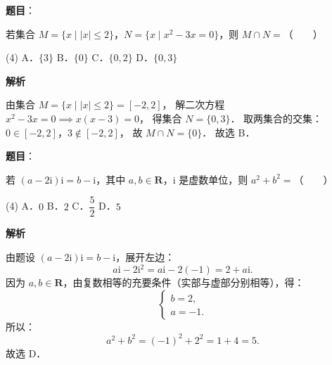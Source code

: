 
\begin{answer}

\textbf{题目}：

若集合 $M = \{x \mid |x| \leqslant 2\}$，$N = \{x \mid x^2 - 3x = 0\}$，则 $M \cap N =$\mbox{（　　）}

\begin{gkopts}(4)
\task A．$\{3\}$
\task B．$\{0\}$
\task C．$\{0, 2\}$
\task D．$\{0, 3\}$
\end{gkopts}

\textbf{解析}

由集合 $M = \{x \mid |x| \leqslant 2\} = [-2, 2]$，
解二次方程 $x^2 - 3x = 0 \implies x(x - 3) = 0$，
得集合 $N = \{0, 3\}$．
取两集合的交集：
$0 \in [-2, 2]$，$3 \notin [-2, 2]$，
故 $M \cap N = \{0\}$．
故选 B．


\end{answer}
\begin{answer}

\textbf{题目}：

若 $(a - 2\mathrm{i})\mathrm{i} = b - \mathrm{i}$，其中 $a, b \in \mathbf{R}$，$\mathrm{i}$ 是虚数单位，则 $a^2 + b^2 =$\mbox{（　　）}

\begin{gkopts}(4)
\task A．$0$
\task B．$2$
\task C．$\dfrac{5}{2}$
\task D．$5$
\end{gkopts}

\textbf{解析}

由题设 $(a - 2\mathrm{i})\mathrm{i} = b - \mathrm{i}$，展开左边：
\nopagebreak[4]
\[
a\mathrm{i} - 2\mathrm{i}^2 = a\mathrm{i} - 2(-1) = 2 + a\mathrm{i}.
\]
因为 $a, b \in \mathbf{R}$，由复数相等的充要条件（实部与虚部分别相等），得：
\nopagebreak[4]
\[
\begin{cases}
b = 2, \\
a = -1.
\end{cases}
\]
所以：
\nopagebreak[4]
\[
a^2 + b^2 = (-1)^2 + 2^2 = 1 + 4 = 5.
\]
故选 D．


\end{answer}
